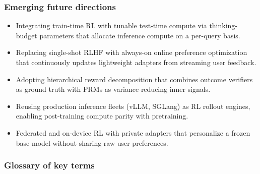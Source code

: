 \documentclass{article}
\begin{document}
\subsubsection{Emerging future directions}\label{emerging-future-directions}

\begin{itemize}

\item
  Integrating train-time RL with tunable test-time compute via thinking-budget parameters that allocate inference compute on a per-query basis.
\item
  Replacing single-shot RLHF with always-on online preference optimization that continuously updates lightweight adapters from streaming user feedback.
\item
  Adopting hierarchical reward decomposition that combines outcome verifiers as ground truth with PRMs as variance-reducing inner signals.
\item
  Reusing production inference fleets (vLLM, SGLang) as RL rollout engines, enabling post-training compute parity with pretraining.
\item
  Federated and on-device RL with private adapters that personalize a frozen base model without sharing raw user preferences.
\end{itemize}

\subsubsection{Glossary of key terms}\label{glossary-of-key-terms}
\end{document}
